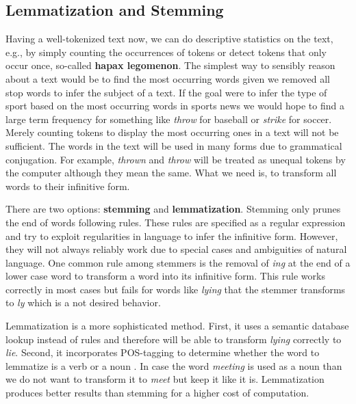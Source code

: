 \subsection{Lemmatization and Stemming}\label{stemming}
Having a well-tokenized text now, we can do descriptive statistics on the text, e.g., by simply counting the occurrences of tokens or detect tokens that only occur once, so-called \textbf{hapax legomenon}.
The simplest way to sensibly reason about a text would be to find the most occurring words given we removed all stop words to infer the subject of a text.
If the goal were to infer the type of sport based on the most occurring words in sports news we would hope to find a large term frequency for something like \textit{throw} for baseball or \textit{strike} for soccer.
Merely counting tokens to display the most occurring ones in a text will not be sufficient.
The words in the text will be used in many forms due to grammatical conjugation.
For example, \textit{thrown} and \textit{throw} will be treated as unequal tokens by the computer although they mean the same.
What we need is, to transform all words to their infinitive form.

There are two options: \textbf{stemming} and \textbf{lemmatization}.
Stemming only prunes the end of words following rules.
These rules are specified as a regular expression and try to exploit regularities in language to infer the infinitive form.
However, they will not always reliably work due to special cases and ambiguities of natural language.
One common rule among stemmers is the removal of \textit{ing} at the end of a lower case word to transform a word into its infinitive form. This rule works correctly in most cases but fails for words like \textit{lying} that the stemmer transforms to \textit{ly} which is a not desired behavior.

Lemmatization is a more sophisticated method.
First, it uses a semantic database lookup instead of rules and therefore will be able to transform \textit{lying} correctly to \textit{lie}.
Second, it incorporates POS-tagging to determine whether the word to lemmatize is a verb or a noun \citep{Muller2015}.
In case the word \textit{meeting} is used as a noun than we do not want to transform it to \textit{meet} but keep it like it is. Lemmatization produces better results than stemming \citep{Balakrishnan2014}  for a higher cost of computation.


